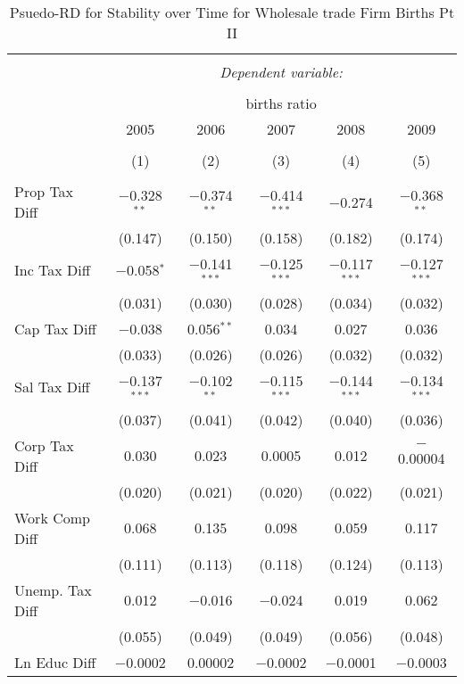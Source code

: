 
\begin{table}[!htbp] \centering 
  \caption{Psuedo-RD for Stability over Time for  Wholesale trade Firm Births Pt II} 
  \label{42year} 
\small 
\begin{tabular}{@{\extracolsep{5pt}}lccccc} 
\\[-1.8ex]\hline 
\hline \\[-1.8ex] 
 & \multicolumn{5}{c}{\textit{Dependent variable:}} \\ 
\cline{2-6} 
\\[-1.8ex] & \multicolumn{5}{c}{births ratio} \\ 
 & 2005 & 2006 & 2007 & 2008 & 2009 \\ 
\\[-1.8ex] & (1) & (2) & (3) & (4) & (5)\\ 
\hline \\[-1.8ex] 
 Prop Tax Diff & $-$0.328$^{**}$ & $-$0.374$^{**}$ & $-$0.414$^{***}$ & $-$0.274 & $-$0.368$^{**}$ \\ 
  & (0.147) & (0.150) & (0.158) & (0.182) & (0.174) \\ 
  Inc Tax Diff & $-$0.058$^{*}$ & $-$0.141$^{***}$ & $-$0.125$^{***}$ & $-$0.117$^{***}$ & $-$0.127$^{***}$ \\ 
  & (0.031) & (0.030) & (0.028) & (0.034) & (0.032) \\ 
  Cap Tax Diff & $-$0.038 & 0.056$^{**}$ & 0.034 & 0.027 & 0.036 \\ 
  & (0.033) & (0.026) & (0.026) & (0.032) & (0.032) \\ 
  Sal Tax Diff & $-$0.137$^{***}$ & $-$0.102$^{**}$ & $-$0.115$^{***}$ & $-$0.144$^{***}$ & $-$0.134$^{***}$ \\ 
  & (0.037) & (0.041) & (0.042) & (0.040) & (0.036) \\ 
  Corp Tax Diff & 0.030 & 0.023 & 0.0005 & 0.012 & $-$0.00004 \\ 
  & (0.020) & (0.021) & (0.020) & (0.022) & (0.021) \\ 
  Work Comp Diff & 0.068 & 0.135 & 0.098 & 0.059 & 0.117 \\ 
  & (0.111) & (0.113) & (0.118) & (0.124) & (0.113) \\ 
  Unemp. Tax Diff & 0.012 & $-$0.016 & $-$0.024 & 0.019 & 0.062 \\ 
  & (0.055) & (0.049) & (0.049) & (0.056) & (0.048) \\ 
  Ln Educ Diff & $-$0.0002 & 0.00002 & $-$0.0002 & $-$0.0001 & $-$0.0003 \\ 

\end{tabular}
\end{table}
